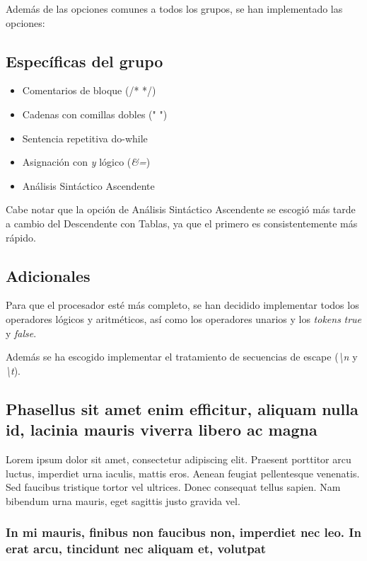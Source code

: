 \documentclass[a4paper]{CSMakotoTechnicalReport}
\begin{document}
\begin{multicols}{2}
    Además de las opciones comunes a todos los grupos, se han implementado las opciones:

    \subsection{Específicas del grupo}

    \begin{itemize}
        \item Comentarios de bloque (/* */)
        \item Cadenas con comillas dobles (" ")
        \item Sentencia repetitiva do-while
        \item Asignación con \textit{y} lógico (\textit{\&=})
        \item Análisis Sintáctico Ascendente
    \end{itemize}

    Cabe notar que la opción de Análisis Sintáctico Ascendente se escogió más tarde a cambio del Descendente con Tablas, ya que el primero es consistentemente más rápido.
    \subsection{Adicionales}

    Para que el procesador esté más completo, se han decidido implementar todos los operadores lógicos y aritméticos, así como los operadores unarios y los \textit{tokens} \textit{true} y \textit{false}.

    Además se ha escogido implementar el tratamiento de secuencias de escape (\textit{\textbackslash n} y \textit{\textbackslash t}).


    \subsection{Phasellus sit amet enim efficitur, aliquam nulla id, lacinia mauris viverra libero ac magna}

    Lorem ipsum dolor sit amet, consectetur adipiscing elit. Praesent porttitor arcu luctus, imperdiet urna iaculis, mattis eros. Aenean feugiat pellentesque venenatis. Sed faucibus tristique tortor vel ultrices. Donec consequat tellus sapien. Nam bibendum urna mauris, eget sagittis justo gravida vel.

    \subsubsection{In mi mauris, finibus non faucibus non, imperdiet nec leo. In erat arcu, tincidunt nec aliquam et, volutpat}


\end{multicols}
\end{document}
